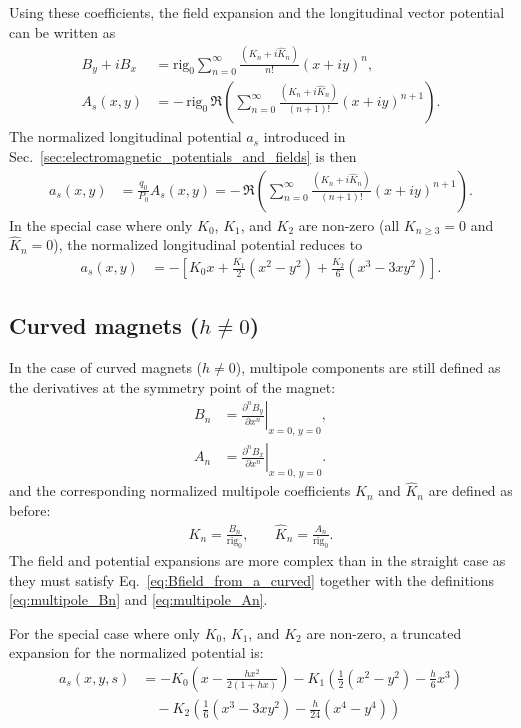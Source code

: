 Using these coefficients, the field expansion and the longitudinal vector potential
can be written as
\begin{align}
  B_y+i B_x &= \mathrm{rig}_0
  \sum_{n=0}^{\infty} \frac{(K_n+i \hat{K}_n)}{n !}(x+i y)^{n}, \\
  A_s(x,y) &= -\,\mathrm{rig}_0\,\Re\left(\sum_{n=0}^{\infty}
  \frac{(K_n+i \hat{K}_n)}{(n+1) !}(x+i y)^{n+1}\right).
\end{align}
The normalized longitudinal potential $a_s$ introduced in
Sec.~\ref{sec:electromagnetic_potentials_and_fields} is then
\begin{align}
  a_s(x,y) &= \frac{q_0}{P_0} A_s(x,y)
  = -\,\Re\left(\sum_{n=0}^{\infty}
  \frac{(K_n+i \hat{K}_n)}{(n+1) !}(x+i y)^{n+1}\right).
\end{align}
In the special case where only $K_0$, $K_1$, and $K_2$ are non-zero (all $K_{n\ge3}=0$
and $\hat{K}_n=0$), the normalized longitudinal potential reduces to
\begin{align}
  a_s(x,y) &= -\left[
  K_0 x + \frac{K_1}{2}\left(x^2 - y^2\right)
  + \frac{K_2}{6}\left(x^3 - 3 x y^2\right) \right].
\end{align}

\subsection{Curved magnets ($h\neq0$)}

In the case of curved magnets ($h\neq0$), multipole components are still defined
as the derivatives at the symmetry point of the magnet:
\begin{align}
  B_n &= \left.\frac{\partial^n B_y}{\partial x^n}\right|_{x=0,\,y=0}, \label{eq:multipole_Bn} \\
  A_n &= \left.\frac{\partial^n B_x}{\partial x^n}\right|_{x=0,\,y=0} . \label{eq:multipole_An}
\end{align}
and the corresponding normalized multipole coefficients $K_n$ and $\hat{K}_n$ are defined as before:
\begin{align}
  K_n=\frac{B_n}{\mathrm{rig}_0}, \quad &
  \hat{K}_n=\frac{A_n}{\mathrm{rig}_0}.
\end{align}
The field and potential expansions are more complex than in the straight case
as they must satisfy Eq.~\ref{eq:Bfield_from_a_curved} together with the definitions \eqref{eq:multipole_Bn}
and \eqref{eq:multipole_An}.

For the special case where only $K_0$, $K_1$, and $K_2$ are non-zero, a truncated expansion
for the normalized potential is:
\begin{align}
a_s(x,y,s)
&= -K_0\left(x-\frac{h x^{2}}{2(1+h x)}\right)
 -K_1\left(\frac{1}{2}(x^{2}-y^{2})-\frac{h}{6}x^{3}\right) \nonumber\\
&\quad -K_2\left(\frac{1}{6}(x^{3}-3xy^{2})-\frac{h}{24}(x^{4}-y^{4})\right)
\label{eq:as_curved}
\end{align}


